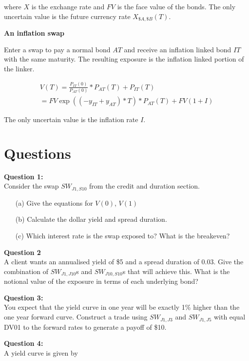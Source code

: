 where $X$ is the exchange rate and $FV$ is the face value of the bonds. The only uncertain value is the future currency rate $X_{\$A,\$B}(T)$.

\textbf{An inflation swap}

Enter a swap to pay a normal bond $AT$ and receive an inflation linked bond $IT$ with the same maturity. The resulting exposure is the inflation linked portion of the linker. 

\begin{eqnarray*}
V(T) = \frac{P_{IT}(0)}{P_{AT}(0)}*P_{AT}(T)+ P_{IT}(T) \\
 =  FV\exp((-y_{IT}+y_{AT})*T)*P_{AT}(T)+ FV(1+I)  
 \end{eqnarray*}

The only uncertain value is the inflation rate $I$.


\section{Questions}

\textbf{Question 1:}\\
Consider the swap $SW_{J1,S10}$ from the credit and duration section. 

\begin{itemize}
\item[(a)] Give the equations for $V(0)$, $V(1)$
\item[(b)] Calculate the dollar yield and spread duration.
\item[(c)] Which interest rate is the swap exposed to? What is the breakeven?
\end{itemize}

\textbf{Question 2}\\

A client wants an annualised yield of \$5 and a spread duration of 0.03. Give the combination of $SW_{J1,J10}$s and $SW_{J10,S10}$s that will achieve this. What is the notional value of the exposure in terms of each underlying bond?

\textbf{Question 3:}\\

You expect that the yield curve in one year will be exactly 1\% higher than the one year forward curve. Construct a trade using $SW_{J1,J3}$ and $SW_{J1,J5}$ with equal DV01 to the forward rates to generate a payoff of \$10.

\textbf{Question 4:}\\

A yield curve is given by 

